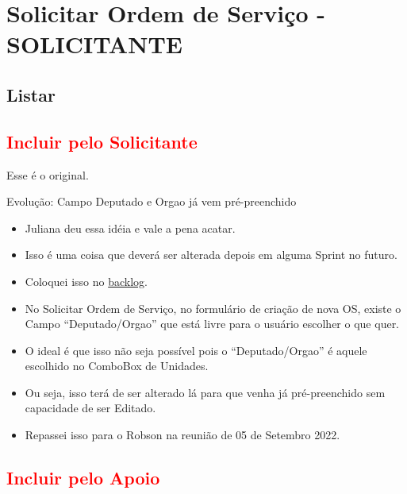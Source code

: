 \section{Solicitar Ordem de Serviço \msfcn - SOLICITANTE}



	\subsection{Listar}

	\subsection{\textcolor{red}{Incluir pelo Solicitante} \msrls}
	
	Esse é o original.
	
	
	\begin{evolutivo}[1]{\hypertarget{r160522-1}{Evolução: Campo Deputado e Orgao já vem pré-preenchido}}
		\begin{itemize}
			\item Juliana deu essa idéia e vale a pena acatar.
			\item Isso é uma coisa que deverá ser alterada depois em alguma Sprint no futuro.
			\item Coloquei isso no \hyperlink{backlog}{backlog}.
		\end{itemize}
		\tcblower		
		\begin{itemize}
			\item No Solicitar Ordem de Serviço, no formulário de criação de nova OS, existe o Campo ``Deputado/Orgao'' que está livre para o usuário escolher o que quer.
		
			\item 	O ideal é que isso não seja possível pois o ``Deputado/Orgao'' é aquele escolhido no ComboBox de Unidades.
			
			\item 	Ou seja, isso terá de ser alterado lá para que venha já pré-preenchido sem capacidade de ser Editado.
			
			\item Repassei isso para o Robson na reunião de 05 de Setembro 2022.	
		\end{itemize}
	\end{evolutivo}
	

	
	\subsection{\textcolor{red}{Incluir pelo Apoio} \msrlv}
	
